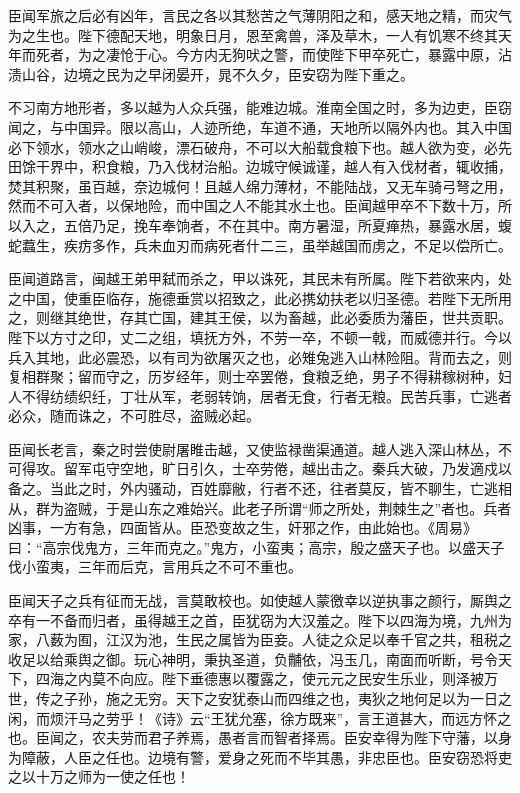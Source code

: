 \documentclass[]{article}
\begin{document}
臣闻军旅之后必有凶年，言民之各以其愁苦之气薄阴阳之和，感天地之精，而灾气为之生也。陛下德配天地，明象日月，恩至禽兽，泽及草木，一人有饥寒不终其天年而死者，为之凄怆于心。今方内无狗吠之警，而使陛下甲卒死亡，暴露中原，沾渍山谷，边境之民为之早闭晏开，晁不久夕，臣安窃为陛下重之。

不习南方地形者，多以越为人众兵强，能难边城。淮南全国之时，多为边吏，臣窃闻之，与中国异。限以高山，人迹所绝，车道不通，天地所以隔外内也。其入中国必下领水，领水之山峭峻，漂石破舟，不可以大船载食粮下也。越人欲为变，必先田馀干界中，积食粮，乃入伐材治船。边城守候诚谨，越人有入伐材者，辄收捕，焚其积聚，虽百越，奈边城何！且越人绵力薄材，不能陆战，又无车骑弓弩之用，然而不可入者，以保地险，而中国之人不能其水土也。臣闻越甲卒不下数十万，所以入之，五倍乃足，挽车奉饷者，不在其中。南方暑湿，所夏瘅热，暴露水居，蝮蛇蠚生，疾疠多作，兵未血刃而病死者什二三，虽举越国而虏之，不足以偿所亡。

臣闻道路言，闽越王弟甲弑而杀之，甲以诛死，其民未有所属。陛下若欲来内，处之中国，使重臣临存，施德垂赏以招致之，此必携幼扶老以归圣德。若陛下无所用之，则继其绝世，存其亡国，建其王侯，以为畜越，此必委质为藩臣，世共贡职。陛下以方寸之印，丈二之组，填抚方外，不劳一卒，不顿一戟，而威德并行。今以兵入其地，此必震恐，以有司为欲屠灭之也，必雉兔逃入山林险阻。背而去之，则复相群聚；留而守之，历岁经年，则士卒罢倦，食粮乏绝，男子不得耕稼树种，妇人不得纺绩织纴，丁壮从军，老弱转饷，居者无食，行者无粮。民苦兵事，亡逃者必众，随而诛之，不可胜尽，盗贼必起。

臣闻长老言，秦之时尝使尉屠睢击越，又使监禄凿渠通道。越人逃入深山林丛，不可得攻。留军屯守空地，旷日引久，士卒劳倦，越出击之。秦兵大破，乃发適戍以备之。当此之时，外内骚动，百姓靡敝，行者不还，往者莫反，皆不聊生，亡逃相从，群为盗贼，于是山东之难始兴。此老子所谓``师之所处，荆棘生之''者也。兵者凶事，一方有急，四面皆从。臣恐变故之生，奸邪之作，由此始也。《周易》曰：``高宗伐鬼方，三年而克之。''鬼方，小蛮夷；高宗，殷之盛天子也。以盛天子伐小蛮夷，三年而后克，言用兵之不可不重也。

臣闻天子之兵有征而无战，言莫敢校也。如使越人蒙徼幸以逆执事之颜行，厮舆之卒有一不备而归者，虽得越王之首，臣犹窃为大汉羞之。陛下以四海为境，九州为家，八薮为囿，江汉为池，生民之属皆为臣妾。人徒之众足以奉千官之共，租税之收足以给乘舆之御。玩心神明，秉执圣道，负黼依，冯玉几，南面而听断，号令天下，四海之内莫不向应。陛下垂德惠以覆露之，使元元之民安生乐业，则泽被万世，传之子孙，施之无穷。天下之安犹泰山而四维之也，夷狄之地何足以为一日之闲，而烦汗马之劳乎！《诗》云``王犹允塞，徐方既来''，言王道甚大，而远方怀之也。臣闻之，农夫劳而君子养焉，愚者言而智者择焉。臣安幸得为陛下守藩，以身为障蔽，人臣之任也。边境有警，爱身之死而不毕其愚，非忠臣也。臣安窃恐将吏之以十万之师为一使之任也！
\end{document}
